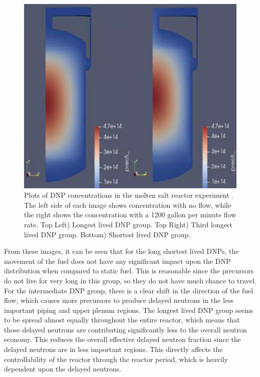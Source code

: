 \begin{figure}[H]
  \includegraphics[scale=0.25]{images/dnp6.PNG}
  \caption{Plots of DNP concentrations in the molten salt reactor experiment \cite{shi_gen-foam_2021}. The left side of each image shows concentration with no flow, while the right shows the concentration with a 1200 gallon per minute flow rate. Top Left) Longest lived DNP group. Top Right) Third longest lived DNP group. Bottom) Shortest lived DNP group.}
   \label{fig:genfoam_dnp_locations}
\end{figure}

From these images, it can be seen that for the long shortest lived DNPs, the movement of the fuel does not have any significant impact upon the DNP distribution when compared to static fuel. This is reasonable since the precursors do not live for very long in this group, so they do not have much chance to travel. For the intermediate DNP group, there is a clear shift in the direction of the fuel flow, which causes more precursors to produce delayed neutrons in the less important piping  and upper plenum regions. The longest lived DNP group seems to be spread almost equally throughout the entire reactor, which means that those delayed neutrons are contributing significantly less to the overall neutron economy. This reduces the overall effective delayed neutron fraction since the delayed neutrons are in less important regions. This directly affects the controllability of the reactor through the reactor period, which is heavily dependent upon the delayed neutrons.

